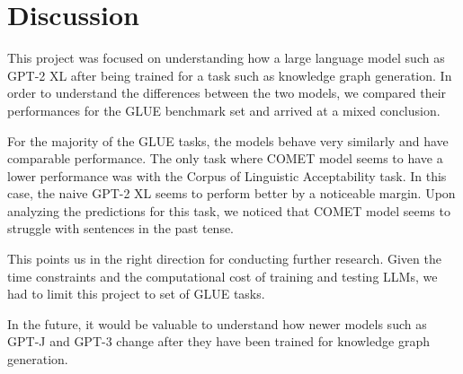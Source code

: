 \documentclass[\main/thesis.tex]{subfiles}
\begin{document}
\chapter{Discussion}

This project was focused on understanding how a large language model such as GPT-2 XL after being trained 
for a task such as knowledge graph generation. In order to understand the differences 
between the two models, we compared their performances for the GLUE benchmark set and arrived at a mixed conclusion. 

For the majority of the GLUE tasks, the models behave very similarly and have comparable performance. The only task where 
COMET model seems to have a lower performance was with the Corpus of Linguistic Acceptability task. In this case, the naive 
GPT-2 XL seems to perform better by a noticeable margin. Upon analyzing the predictions for this task, we noticed that 
COMET model seems to struggle with sentences in the past tense. 

This points us in the right direction for conducting further research. Given the time constraints and the 
computational cost of training and testing LLMs, we had to limit this project to set of GLUE tasks. 

In the future, it would be valuable to understand how newer models such as GPT-J and GPT-3 change after
they have been trained for knowledge graph generation. 
\end{document}
